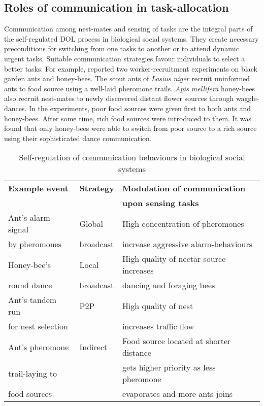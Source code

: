 \documentclass{intech}
\begin{document}
\subsection{Roles of communication in task-allocation}
\label{bg:bio-comm:comm-role}
Communication among nest-mates and sensing of tasks are the integral parts of the self-regulated DOL process in biological social systems. They create necessary  preconditions for switching from one tasks to another or to attend dynamic urgent tasks. Suitable communication strategies favour individuals to select a better tasks. For example, \cite{Garnier+2007} reported two worker-recruitment experiments on black garden ants and honey-bees. The scout ants of {\em Lasius niger}  recruit uninformed ants to food source using a well-laid pheromone trails. {\em Apis mellifera} honey-bees also recruit nest-mates to newly discovered distant flower sources through waggle-dances. In the experiments,  poor food sources were given first to both ants and honey-bees. After some time,  rich food sources were introduced  to them. It was found that only honey-bees were able to switch from poor source to a rich source using their sophisticated dance communication.
\begin{table}
\caption{Self-regulation of communication behaviours in biological social systems}
\label{table:bio-comm-task-urgency}
\begin{center}
\begin{tabular}{|l|l|l|}
\hline \textbf{Example event} & \textbf{Strategy} & \textbf{Modulation of communication}\\
&  &  \textbf{upon sensing tasks}\\
\hline Ant's alarm signal &  Global  & High concentration of pheromones\\
by pheromones & broadcast &  increase aggressive alarm-behaviours \\                                                                                                                                               
\hline Honey-bee's  & Local  &  High quality of nectar source increases \\
round dance & broadcast & dancing and foraging bees\\
\hline Ant's tandem run     & P2P & High quality of nest \\
for nest selection & &   increases traffic flow\\
\hline Ant's pheromone   & Indirect & Food source located at shorter distance\\
trail-laying to   & &  gets higher priority as less pheromone \\
food sources & & evaporates and more ants joins\\
\hline
\end{tabular}
\end{center}
\end{table}
\end{document}
